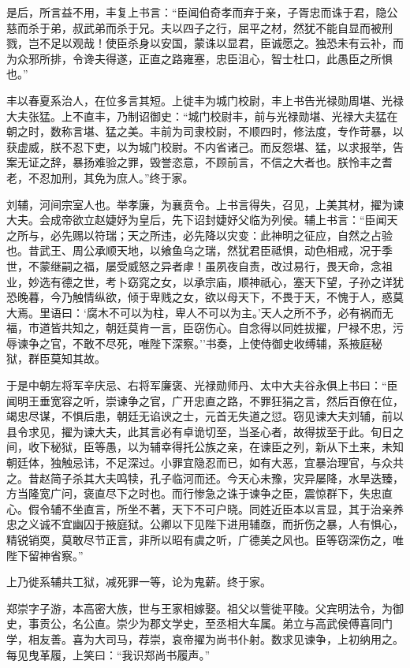 \documentclass[]{article}
\begin{document}
是后，所言益不用，丰复上书言：``臣闻伯奇孝而弃于亲，子胥忠而诛于君，隐公慈而杀于弟，叔武弟而杀于兄。夫以四子之行，屈平之材，然犹不能自显而被刑戮，岂不足以观哉！使臣杀身以安国，蒙诛以显君，臣诚愿之。独恐未有云补，而为众邪所排，令谗夫得遂，正直之路雍塞，忠臣沮心，智士杜口，此愚臣之所惧也。''

丰以春夏系治人，在位多言其短。上徙丰为城门校尉，丰上书告光禄勋周堪、光禄大夫张猛。上不直丰，乃制诏御史：``城门校尉丰，前与光禄勋堪、光禄大夫猛在朝之时，数称言堪、猛之美。丰前为司隶校尉，不顺四时，修法度，专作苛暴，以获虚威，朕不忍下吏，以为城门校尉。不内省诸己。而反怨堪、猛，以求报举，告案无证之辞，暴扬难验之罪，毁誉恣意，不顾前言，不信之大者也。朕怜丰之耆老，不忍加刑，其免为庶人。''终于家。

刘辅，河间宗室人也。举孝廉，为襄贲令。上书言得失，召见，上美其材，擢为谏大夫。会成帝欲立赵婕妤为皇后，先下诏封婕妤父临为列侯。辅上书言：``臣闻天之所与，必先赐以符瑞；天之所违，必先降以灾变：此神明之征应，自然之占验也。昔武王、周公承顺天地，以飨鱼乌之瑞，然犹君臣祗惧，动色相戒，况于季世，不蒙继嗣之福，屡受威怒之异者虖！虽夙夜自责，改过易行，畏天命，念祖业，妙选有德之世，考卜窈窕之女，以承宗庙，顺神祇心，塞天下望，子孙之详犹恐晚暮，今乃触情纵欲，倾于卑贱之女，欲以母天下，不畏于天，不愧于人，惑莫大焉。里语曰：`腐木不可以为柱，卑人不可以为主。'天人之所不予，必有祸而无福，市道皆共知之，朝廷莫肯一言，臣窃伤心。自念得以同姓拔擢，尸禄不忠，污辱谏争之官，不敢不尽死，唯陛下深察。''书奏，上使侍御史收缚辅，系掖庭秘狱，群臣莫知其故。

于是中朝左将军辛庆忌、右将军廉褒、光禄勋师丹、太中大夫谷永俱上书曰：``臣闻明王垂宽容之听，崇谏争之官，广开忠直之路，不罪狂狷之言，然后百僚在位，竭忠尽谋，不惧后患，朝廷无谄谀之士，元首无失道之愆。窃见谏大夫刘辅，前以县令求见，擢为谏大夫，此其言必有卓诡切至，当圣心者，故得拔至于此。旬日之间，收下秘狱，臣等愚，以为辅幸得托公族之亲，在谏臣之列，新从下土来，未知朝廷体，独触忌讳，不足深过。小罪宜隐忍而已，如有大恶，宜暴治理官，与众共之。昔赵简子杀其大夫鸣犊，孔子临河而还。今天心未豫，灾异屡降，水旱迭臻，方当隆宽广问，褒直尽下之时也。而行惨急之诛于谏争之臣，震惊群下，失忠直心。假令辅不坐直言，所坐不著，天下不可户晓。同姓近臣本以言显，其于治亲养忠之义诚不宜幽囚于掖庭狱。公卿以下见陛下进用辅亟，而折伤之暴，人有惧心，精锐销耎，莫敢尽节正言，非所以昭有虞之听，广德美之风也。臣等窃深伤之，唯陛下留神省察。''

上乃徙系辅共工狱，减死罪一等，论为鬼薪。终于家。

郑崇字子游，本高密大族，世与王家相嫁娶。祖父以訾徙平陵。父宾明法令，为御史，事贡公，名公直。崇少为郡文学史，至丞相大车属。弟立与高武侯傅喜同门学，相友善。喜为大司马，荐崇，哀帝擢为尚书仆射。数求见谏争，上初纳用之。每见曳革履，上笑曰：``我识郑尚书履声。''
\end{document}
